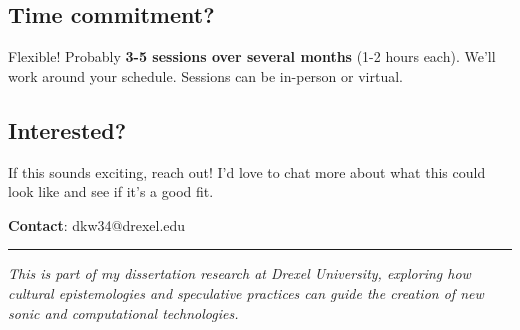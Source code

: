 \subsection*{Time commitment?}

Flexible! Probably \textbf{3-5 sessions over several months} (1-2 hours each). We'll work around your schedule. Sessions can be in-person or virtual.

\subsection*{Interested?}

If this sounds exciting, reach out! I'd love to chat more about what this could look like and see if it's a good fit.

\textbf{Contact}: dkw34@drexel.edu

\vspace{1em}

\begin{center}
	\rule{0.8\textwidth}{0.5pt}
	
	\small\textit{This is part of my dissertation research at Drexel University, exploring how cultural epistemologies and speculative practices can guide the creation of new sonic and computational technologies.}
\end{center}